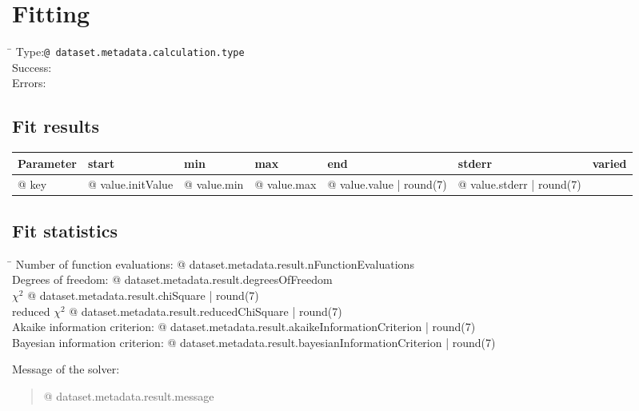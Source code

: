 \section{Fitting}

\begin{tabbing}
\hspace*{1.5cm}\=\kill
Type:\>\texttt{{@ dataset.metadata.calculation.type }}
\\
Success:\>%
\\
Errors:\>%
\end{tabbing}

\subsection{Fit results}

\begin{tabular}{lllllll}
\toprule
Parameter & start & min & max & end & stderr & varied
\\
\midrule
{@ key } & {@ value.initValue } & {@ value.min } & {@ value.max } & {@ value.value | round(7) } & {@ value.stderr | round(7) } & %
\\
\bottomrule
\end{tabular}


\subsection{Fit statistics}

\begin{tabbing}
\hspace*{5.5cm}\=\kill
Number of function evaluations:\> {@ dataset.metadata.result.nFunctionEvaluations }
\\
Degrees of freedom:\> {@ dataset.metadata.result.degreesOfFreedom }
\\
$\chi^2$\> {@ dataset.metadata.result.chiSquare | round(7) }
\\
reduced $\chi^2$\> {@ dataset.metadata.result.reducedChiSquare | round(7) }
\\
Akaike information criterion:\> {@ dataset.metadata.result.akaikeInformationCriterion | round(7) }
\\
Bayesian information criterion:\> {@ dataset.metadata.result.bayesianInformationCriterion | round(7) }
\end{tabbing}

Message of the solver:

\begin{quote}
{@ dataset.metadata.result.message }
\end{quote}

